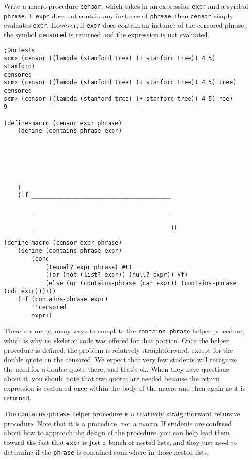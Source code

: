 \begin{blocksection}
\question Write a macro procedure \lstinline{censor}, which takes in an expression \lstinline{expr} and a symbol \lstinline{phrase}. If \lstinline{expr} does not contain any instance of \lstinline{phrase}, then \lstinline{censor} simply evaluates \lstinline{expr}. However, if \lstinline{expr} does contain an instance of the censored phrase, the symbol \lstinline{censored} is returned and the expression is not evaluated.

\begin{lstlisting}
;Doctests
scm> (censor ((lambda (stanford tree) (+ stanford tree)) 4 5) stanford)
censored
scm> (censor ((lambda (stanford tree) (+ stanford tree)) 4 5) tree)
censored
scm> (censor ((lambda (stanford tree) (+ stanford tree)) 4 5) ree)
9

(define-macro (censor expr phrase)
    (define (contains-phrase expr)
    
    
    
    
    
    
    )
    (if ________________________________________

        ________________________________________

        ________________________________________))
\end{lstlisting}

\begin{solution}
\begin{lstlisting}
(define-macro (censor expr phrase)
    (define (contains-phrase expr)
        (cond 
            ((equal? expr phrase) #t)
            ((or (not (list? expr)) (null? expr)) #f)
            (else (or (contains-phrase (car expr)) (contains-phrase (cdr expr))))))
    (if (contains-phrase expr)
        ''censored
        expr))
\end{lstlisting}
\end{solution}
\end{blocksection}

\begin{questionmeta}
    There are many, many ways to complete the \lstinline{contains-phrase} helper procedure, which is why no skeleton code was offered for that portion. Once the helper procedure is defined, the problem is relatively straightforward, except for the double quote on the censored. We expect that very few students will recognize the need for a double quote there, and that's ok. When they have questions about it, you should note that two quotes are needed because the return expression is evaluated once within the body of the macro and then again as it is returned. 
    
    The \lstinline{contains-phrase} helper procedure is a relatively straightforward recursive procedure. Note that it is a procedure, not a macro. If students are confused about how to approach the design of the procedure, you can help lead them toward the fact that \lstinline{expr} is just a bunch of nested lists, and they just need to determine if the \lstinline{phrase} is contained somewhere in those nested lists. 
    \end{questionmeta}